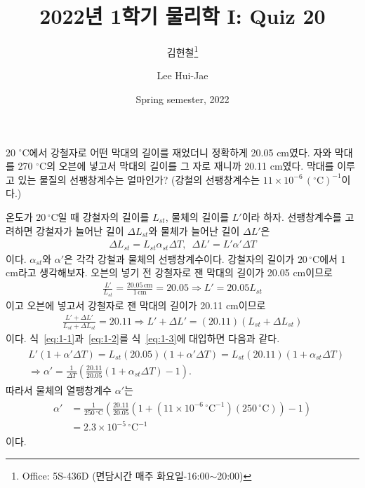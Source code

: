 \documentclass[floatfix,nofootinbib,superscriptaddress,fleqn]{revtex4-2}
\begin{document}
\title{\Large 2022년 1학기 물리학 I: Quiz 20}
\author{김현철\footnote{Office: 5S-436D (면담시간 매주
    화요일-16:00$\sim$20:00)}} 
\author{Lee Hui-Jae} 
\date{Spring semester, 2022}


\vspace{1.cm}

\maketitle
{} 
20 ${}^\circ\mathrm{C}$에서 강철자로
어떤 막대의 길이를 재었더니 정확하게 20.05 cm였다. 자와 막대를 270
${}^\circ\mathrm{C}$의 오븐에 넣고서 막대의 길이를 그 자로 재니까
20.11 cm였다. 막대를 이루고 있는 물질의 선팽창계수는 얼마인가? 
(강철의 선팽창계수는 $11\times 10^{-6}
\,({}^\circ\mathrm{C})^{-1}$이다.) 

\vspace{1.cm}

온도가 $20\,\mathrm{^\circ C}$일 때 강철자의 길이를 $L_{st}$,
물체의 길이를 $L'$이라 하자.
선팽창계수를 고려하면 강철자가 늘어난 길이 $\Delta L_{st}$와
물체가 늘어난 길이 $\Delta L'$은
\begin{align}\label{eq:1-1}
  \Delta L_{st} =L_{st}\alpha_{st}\Delta T,\,\,\,
  \Delta L' =L'\alpha'\Delta T
\end{align}
이다. $\alpha_{st}$와 $\alpha'$은 각각 강철과 물체의 선팽창계수이다. 
강철자의 길이가 $20\,\mathrm{^\circ C}$에서 1 cm라고 생각해보자. 
오븐의 넣기 전 강철자로 잰 막대의 길이가 20.05 cm이므로
\begin{align}\label{eq:1-2}
  \frac{L'}{L_{st}} = \frac{20.05\,\mathrm{cm}}{1\,\mathrm{cm}}
  =20.05 \Longrightarrow L' = 20.05 L_{st}
\end{align}
이고 오븐에 넣고서 강철자로 잰 막대의 길이가 20.11 cm이므로
\begin{align}\label{eq:1-3}
  \frac{L'+\Delta L'}{L_{st}+\Delta L_{st}} = 20.11
  \Longrightarrow 
  L'+\Delta L' = (20.11)(L_{st}+\Delta L_{st})
\end{align}
이다. 식~\eqref{eq:1-1}과~\eqref{eq:1-2}를 식~\eqref{eq:1-3}에 대입하면
다음과 같다.
\begin{align}
  \begin{split}
    &L'(1+\alpha'\Delta T) = L_{st}(20.05)(1+\alpha'\Delta T)
    = L_{st}(20.11)(1+\alpha_{st}\Delta T)  \\
    &\Longrightarrow \alpha' = \frac{1}{\Delta T}\left(\frac{20.11}{20.05}
    (1+\alpha_{st}\Delta T)-1\right).
  \end{split}
\end{align}
따라서 물체의 열팽창계수 $\alpha'$는
\begin{align}
  \begin{split}
    \alpha' &= \frac{1}{250\,\mathrm{^\circ C}}\left(\frac{20.11}{20.05}
    \left(1+(11\times 10^{-6}\,\mathrm{^\circ C^{-1}})
    (250\,\mathrm{^\circ C})\right)-1\right)  \\
    &=2.3\times 10^{-5}\,\mathrm{^\circ C^{-1}}
  \end{split}
\end{align}
이다.
\end{document}
